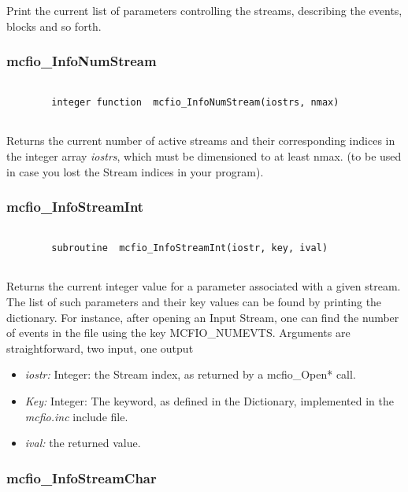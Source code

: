 	Print the current list of parameters controlling the streams, 
describing the events, blocks and so forth.

\subsubsection{mcfio\_InfoNumStream}

\begin{verbatim}

        integer function  mcfio_InfoNumStream(iostrs, nmax)
    
\end{verbatim}

	Returns the current number of active streams and their 
corresponding indices in the integer array {\em iostrs}, which 
must be dimensioned to at least nmax. (to be used in case you 
lost the Stream indices in your program).

\subsubsection{mcfio\_InfoStreamInt}

\begin{verbatim}

        subroutine  mcfio_InfoStreamInt(iostr, key, ival)
    
\end{verbatim}

	Returns the current integer value for a parameter associated with a 
given stream. The list of such parameters and their key values 
can be found by printing the dictionary. For instance, after opening 
an Input Stream, one can find the number of events in the file 
using the key MCFIO\_NUMEVTS. Arguments are straightforward, two input,
one output

\begin{itemize}
\item {\em iostr:} Integer: the Stream index, as returned by a mcfio\_Open* 
call.
\item {\em Key:} Integer: The keyword, as defined in the Dictionary, 
implemented in the {\em mcfio.inc} include file. 
\item {\em ival:} the  returned value.
\end{itemize}

 
\subsubsection{mcfio\_InfoStreamChar}

